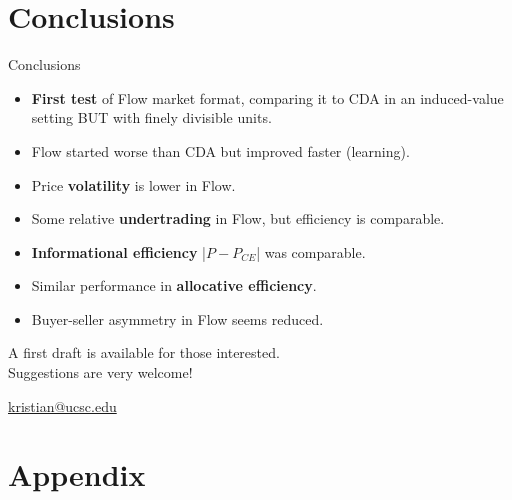 \documentclass[10pt]{beamer}
\begin{document}


\section{Conclusions}

\begin{frame}{Conclusions}
\begin{itemize}
\item \textbf{First test} of Flow market format, comparing it to CDA in an induced-value setting BUT with finely divisible units. %
\vspace{0.3cm}
\item Flow started worse than CDA but improved faster (learning).
\item Price \textbf{volatility} is lower in Flow.  %
\item Some relative \textbf{undertrading} in Flow, but efficiency is comparable.
\item \textbf{Informational efficiency} |$P-P_{CE}$| was comparable. %
\item Similar performance in \textbf{allocative efficiency}. %
\item Buyer-seller asymmetry in Flow seems reduced.%
\end{itemize} 
\vspace{0.4cm}

\begin{center}
{\large A first draft is available for those interested. \\ Suggestions are very welcome!}

\url{kristian@ucsc.edu}
    
\end{center}


\end{frame}








\section{Appendix}
\end{document}
